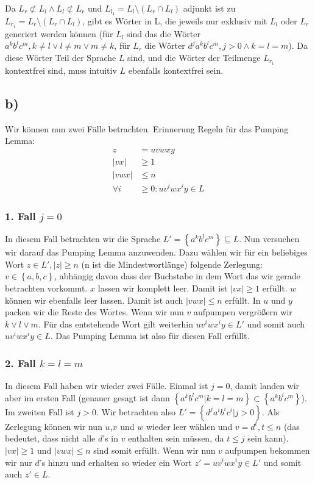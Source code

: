 \documentclass{article}
\begin{document}
Da $L_r \not\subset L_l \wedge L_l \not\subset L_r$ und $L_{l_1} = L_l \setminus \left( L_r \cap L_l \right)$ adjunkt ist zu $L_{r_1} = L_r \setminus \left( L_r \cap L_l \right)$, gibt es Wörter in L, die jeweils nur exklusiv mit $L_l$ oder $L_r$ generiert werden können (für $L_l$ sind das die Wörter $a^kb^lc^m, k\neq l \vee l \neq m \vee m \neq k$, für $L_r$ die Wörter $d^ja^kb^lc^m, j>0 \wedge k=l=m$). Da diese Wörter Teil der Sprache $L$ sind, und die Wörter der Teilmenge $L_{r_1}$ kontextfrei sind, muss intuitiv $L$ ebenfalls kontextfrei sein.


\subsection*{b)}
Wir können nun zwei Fälle betrachten. Erinnerung Regeln für das Pumping Lemma:
\begin{align*}
z &= uvwxy \\
|vx| &\geq 1\\
|vwx| &\leq n \\
\forall i &\geq 0: uv^iwx^iy\in L 
\end{align*}

\subsubsection*{1. Fall $j=0$}
In diesem Fall betrachten wir die Sprache $L'=\left\{a^kb^lc^m\right\} \subseteq L$. Nun versuchen wir darauf das Pumping Lemma anzuwenden. Dazu wählen wir für ein beliebiges Wort $z\in L',|z|\geq n$ (n ist die Mindestwortlänge) folgende Zerlegung: $v\in \left\{a,b,c\right\}$, abhängig davon dass der Buchstabe in dem Wort das wir gerade betrachten vorkommt. $x$ lassen wir komplett leer. Damit ist $|vx| \geq 1$ erfüllt. $w$ können wir ebenfalls leer lassen. Damit ist auch $|vwx| \leq n$ erfüllt. In $u$ und $y$ packen wir die Reste des Wortes. Wenn wir nun $v$ aufpumpen vergrößern wir $k \vee l \vee m$. Für das entstehende Wort gilt weiterhin $uv^iwx^iy \in L'$ und somit auch $uv^iwx^iy \in L$. Das Pumping Lemma ist also für diesen Fall erfüllt.

\subsubsection*{2. Fall $k=l=m$}
In diesem Fall haben wir wieder zwei Fälle. Einmal ist $j=0$, damit landen wir aber im ersten Fall (genauer gesagt ist dann $\left\{a^kb^lc^m|k=l=m\right\} \subset \left\{a^kb^lc^m\right\}$). Im zweiten Fall ist $j>0$. Wir betrachten also $L'=\left\{d^ja^ib^ic^i|j>0\right\}$. Als Zerlegung können wir nun $u$,$x$ und $w$ wieder leer wählen und $v=d^t, t\leq n$ (das bedeutet, dass nicht alle $d$'s in $v$ enthalten sein müssen, da $t\leq j$ sein kann). $|vx| \geq 1$ und $|vwx| \leq n$ sind somit erfüllt. Wenn wir nun $v$ aufpumpen bekommen wir nur $d$'s hinzu und erhalten so wieder ein Wort $z' = uv^iwx^iy \in L'$ und somit auch $z' \in L$.
\end{document}
